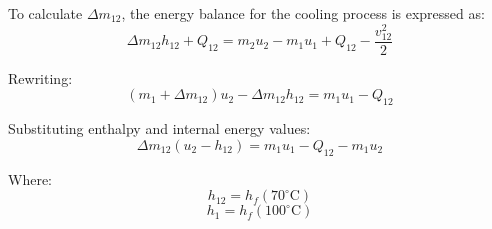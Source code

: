 To calculate \( \Delta m_{12} \), the energy balance for the cooling process is expressed as:  
\[
\Delta m_{12} h_{12} + Q_{12} = m_2 u_2 - m_1 u_1 + Q_{12} - \frac{v_{12}^2}{2}
\]  

Rewriting:  
\[
(m_1 + \Delta m_{12}) u_2 - \Delta m_{12} h_{12} = m_1 u_1 - Q_{12}
\]  

Substituting enthalpy and internal energy values:  
\[
\Delta m_{12} (u_2 - h_{12}) = m_1 u_1 - Q_{12} - m_1 u_2
\]  

Where:  
\[
h_{12} = h_f(70^\circ\text{C})
\]  
\[
h_1 = h_f(100^\circ\text{C})
\]